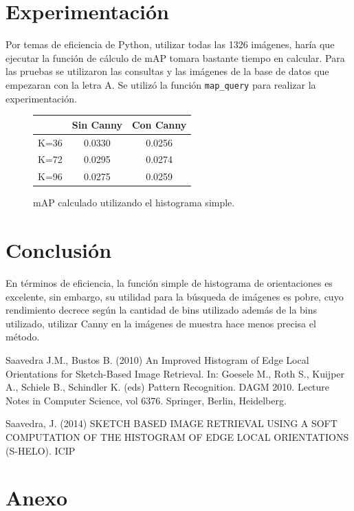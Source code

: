 \documentclass[conference]{IEEEtran}
\begin{document}
\section*{Experimentación}
    Por temas de eficiencia de Python, utilizar todas las 1326 imágenes, haría que ejecutar la función de cálculo de mAP tomara bastante tiempo en calcular. Para las pruebas se utilizaron las consultas y las imágenes de la base de datos que empezaran con la letra A.
    Se utilizó la función \texttt{map\_query} para realizar la experimentación.

\begin{figure}[ht]
    \centering
    \begin{tabular}{|c|c|c|}
    \hline 
     & Sin Canny & Con Canny \\ 
    \hline 
    K=36 & 0.0330 & 0.0256 \\ 
    \hline 
    K=72 & 0.0295 & 0.0274 \\ 
    \hline 
    K=96 & 0.0275 & 0.0259 \\ 
    \hline 
    \end{tabular} 
\caption{mAP calculado utilizando el histograma simple.}    
    
\end{figure}
\section*{Conclusión}
    En términos de eficiencia, la función simple de histograma de orientaciones es excelente, sin embargo, su utilidad para la búsqueda de imágenes es pobre, cuyo rendimiento decrece según la cantidad de bins utilizado además de la bins utilizado, utilizar Canny en la imágenes de muestra hace menos precisa el método.


\begin{thebibliography}{99}
 Saavedra J.M., Bustos B. (2010) An Improved Histogram of Edge Local Orientations for Sketch-Based Image Retrieval. In: Goesele M., Roth S., Kuijper A., Schiele B., Schindler K. (eds) Pattern Recognition. DAGM 2010. Lecture Notes in Computer Science, vol 6376. Springer, Berlin, Heidelberg.

  Saavedra, J. (2014) SKETCH BASED IMAGE RETRIEVAL USING A SOFT COMPUTATION OF THE HISTOGRAM OF EDGE LOCAL ORIENTATIONS (S-HELO). ICIP

\end{thebibliography}

\section*{Anexo}
\end{document}
